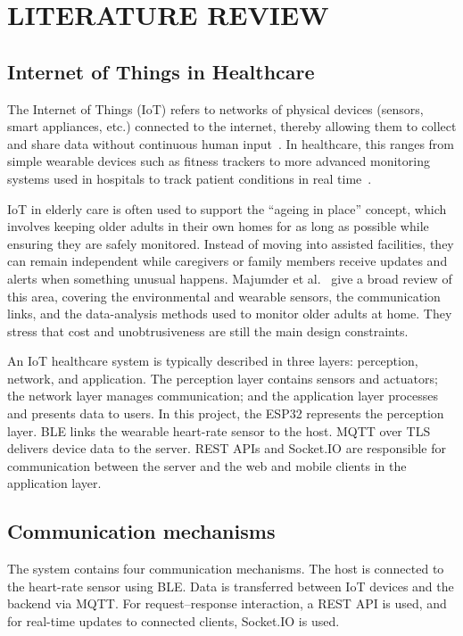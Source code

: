 \chapter{LITERATURE REVIEW}

\section{Internet of Things in Healthcare}

The Internet of Things (IoT) refers to networks of physical devices (sensors, smart appliances, etc.) connected to the internet, thereby allowing them to collect and share data without continuous human input~\cite{Gubbi2013}. In healthcare, this ranges from simple wearable devices such as fitness trackers to more advanced monitoring systems used in hospitals to track patient conditions in real time~\cite{Islam2015}.

IoT in elderly care is often used to support the “ageing in place” concept, which involves keeping older adults in their own homes for as long as possible while ensuring they are safely monitored. Instead of moving into assisted facilities, they can remain independent while caregivers or family members receive updates and alerts when something unusual happens. Majumder et al.~\cite{Majumder2017} give a broad review of this area, covering the environmental and wearable sensors, the communication links, and the data-analysis methods used to monitor older adults at home. They stress that cost and unobtrusiveness are still the main design constraints.

An IoT healthcare system is typically described in three layers: perception, network, and application. The perception layer contains sensors and actuators; the network layer manages communication; and the application layer processes and presents data to users. In this project, the ESP32 represents the perception layer. BLE links the wearable heart-rate sensor to the host. MQTT over TLS delivers device data to the server. REST APIs and Socket.IO are responsible for communication between the server and the web and mobile clients in the application layer.


\section{Communication mechanisms}
\label{sec:comm_protocols}

The system contains four communication mechanisms. The host is connected to the heart-rate sensor using BLE. Data is transferred between IoT devices and the backend via MQTT. For request--response interaction, a REST API is used, and for real-time updates to connected clients, Socket.IO is used.

